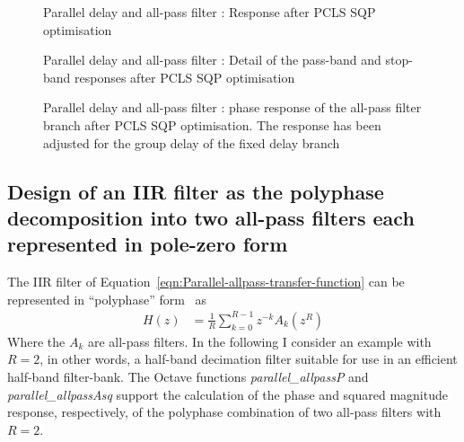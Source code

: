 \documentclass[a4paper,twoside,10pt,english]{report}
\begin{document}
\begin{figure}[!htbp]
\begin{center}
\scalebox{0.7}{}
\caption{Parallel delay and all-pass filter : Response after PCLS SQP optimisation}
\label{fig:Parallel-allpass-delay-filter-PCLS-SQP-response}
\end{center}
\end{figure}
\begin{figure}[!htbp]
\begin{center}
\scalebox{0.7}{}
\caption{Parallel delay and all-pass filter : Detail of the pass-band and
  stop-band responses after PCLS SQP optimisation}
\label{fig:Parallel-allpass-delay-filter-PCLS-SQP-detail-response}
\end{center}
\end{figure}
\begin{figure}[!htbp]
\begin{center}
\scalebox{0.7}{}
\caption{Parallel delay and all-pass filter : phase response of the all-pass
  filter branch after PCLS SQP optimisation. The response has been adjusted
  for the group delay of the fixed delay branch}
\label{fig:Parallel-allpass-delay-filter-PCLS-SQP-a1phase}
\end{center}
\end{figure}
\clearpage
\subsection{\label{sec:IIR-filter-polyphase-decomposition-all-pass-filters}Design of an IIR filter as the polyphase decomposition into two all-pass filters each represented in pole-zero form}
The IIR filter of Equation~\ref{eqn:Parallel-allpass-transfer-function} can be
represented in ``polyphase''
form~\cite{RenforsSaramaki_RecursiveNthBandDigitalFiltersPart1,RenforsSaramaki_RecursiveNthBandDigitalFiltersPart2} as
\begin{align}
H\left(z\right) &= \frac{1}{R}\sum_{k=0}^{R-1}z^{-k}A_{k}\left(z^R\right)
\label{eqn:Polyphase-allpass-transfer-function}  
\end{align}
Where the $A_{k}$ are all-pass filters. In the following I consider an example
with $R=2$, in other words, a half-band decimation filter suitable for use
in an efficient half-band filter-bank. The Octave functions
\emph{parallel\_allpassP} and \emph{parallel\_allpassAsq} support the calculation
of the phase and squared magnitude response, respectively, of the polyphase
combination of two all-pass filters with $R=2$. 
\end{document}
